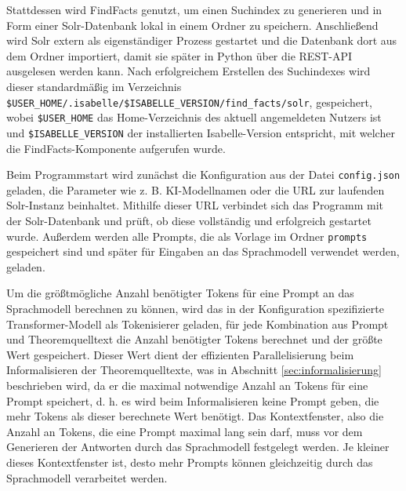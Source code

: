 \documentclass[12pt,letterpaper]{article} %
\begin{document}
Stattdessen wird FindFacts genutzt, um einen Suchindex zu generieren und in Form einer Solr-Datenbank lokal in einem Ordner zu speichern.
Anschließend wird Solr extern als eigenständiger Prozess gestartet und die Datenbank dort aus dem Ordner importiert, damit sie später in Python über die REST-API ausgelesen werden kann.
Nach erfolgreichem Erstellen des Suchindexes wird dieser standardmäßig im Verzeichnis \texttt{\$USER\_HOME/.isabelle/\$ISABELLE\_VERSION/find\_facts/solr}, gespeichert, wobei \texttt{\$USER\_HOME} das Home-Verzeichnis des aktuell angemeldeten Nutzers ist und \texttt{\$ISABELLE\_VERSION} der installierten Isabelle-Version entspricht, mit welcher die FindFacts-Komponente aufgerufen wurde.

Beim Programmstart wird zunächst die Konfiguration aus der Datei \texttt{config.json} geladen, die Parameter wie z. B. KI-Modellnamen oder die URL zur laufenden Solr-Instanz beinhaltet.
Mithilfe dieser URL verbindet sich das Programm mit der Solr-Datenbank und prüft, ob diese vollständig und erfolgreich gestartet wurde.
Außerdem werden alle Prompts, die als Vorlage im Ordner \texttt{prompts} gespeichert sind und später für Eingaben an das Sprachmodell verwendet werden, geladen.

Um die größtmögliche Anzahl benötigter Tokens für eine Prompt an das Sprachmodell berechnen zu können, wird das in der Konfiguration spezifizierte Transformer-Modell als Tokenisierer geladen, für jede Kombination aus Prompt und Theoremquelltext die Anzahl benötigter Tokens berechnet und der größte Wert gespeichert.
Dieser Wert dient der effizienten Parallelisierung beim Informalisieren der Theoremquelltexte, was in Abschnitt \ref{sec:informalisierung} beschrieben wird, da er die maximal notwendige Anzahl an Tokens für eine Prompt speichert, d. h. es wird beim Informalisieren keine Prompt geben, die mehr Tokens als dieser berechnete Wert benötigt.
Das Kontextfenster, also die Anzahl an Tokens, die eine Prompt maximal lang sein darf, muss vor dem Generieren der Antworten durch das Sprachmodell festgelegt werden.
Je kleiner dieses Kontextfenster ist, desto mehr Prompts können gleichzeitig durch das Sprachmodell verarbeitet werden.
\end{document}
